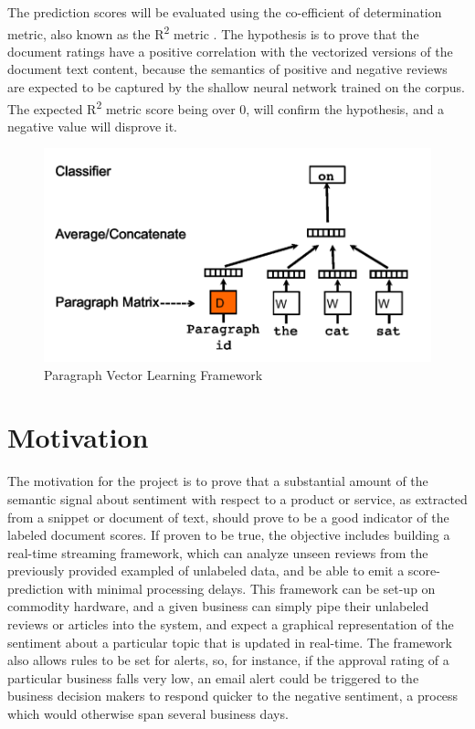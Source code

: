 \documentclass[conference]{IEEEtran}
\begin{document}
    The prediction scores will be evaluated using the co-efficient of determination metric, also known as the R\textsuperscript{2} metric \cite{cameron1997r}. The hypothesis is to prove that the document ratings have a positive correlation with the vectorized versions of the document text content, because the semantics of positive and negative reviews are expected to be captured by the shallow neural network trained on the corpus. The expected R\textsuperscript{2} metric score being over 0, will confirm the hypothesis, and a negative value will disprove it.

\begin{figure}[ht] \label{fig:paragraph-vector-framework}
    \centering
    \includegraphics[width=400pt]{images/docvec_1.png}
    \caption{Paragraph Vector Learning Framework\cite{mikolov2013distributed}}
\end{figure}

\vspace{5mm}

\section{Motivation}
    The motivation for the project is to prove that a substantial amount of the semantic signal about sentiment with respect to a product or service, as extracted from a snippet or document of text, should prove to be a good indicator of the labeled document scores. If proven to be true, the objective includes building a real-time streaming framework, which can analyze unseen reviews from the previously provided exampled of unlabeled data, and be able to emit a score-prediction with minimal processing delays. This framework can be set-up on commodity hardware, and a given business can simply pipe their unlabeled reviews or articles into the system, and expect a graphical representation of the sentiment about a particular topic that is updated in real-time. The framework also allows rules to be set for alerts, so, for instance, if the approval rating of a particular business falls very low, an email alert could be triggered to the business decision makers to respond quicker to the negative sentiment, a process which would otherwise span several business days.
\end{document}
